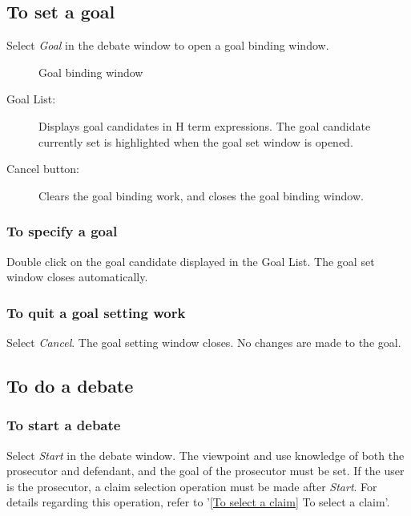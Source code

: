 \subsection{To set a goal} 
Select {\sl Goal} in the debate window to open a goal binding window.

\begin{figure}[htb]
\begin{center}
\end{center}
\caption{Goal binding window}\label{Goal binding window}
\end{figure}

\begin{description}
\item[Goal List:] Displays goal candidates in H term expressions.
The goal candidate currently set is highlighted when the goal set window is opened. 
\item[Cancel button:] Clears the goal binding work, and closes the goal binding window.
\end{description}

\subsubsection{To specify a goal}
\medskip
Double click on the goal candidate displayed in the Goal List.  The goal set window closes automatically.

\subsubsection{To quit a goal setting work}
\medskip
Select {\sl Cancel}.
The goal setting window closes. 
No changes are made to the goal.

\subsection{To do a debate} 

\subsubsection{To start a debate}
Select {\sl Start} in the debate window.
The viewpoint and use knowledge of both the prosecutor and defendant, and the goal of the prosecutor must be set.
If the user is the prosecutor, a claim selection operation must be
made after {\sl Start}.
For details regarding this operation, refer to '\ref{To select a claim} To select a claim'.


